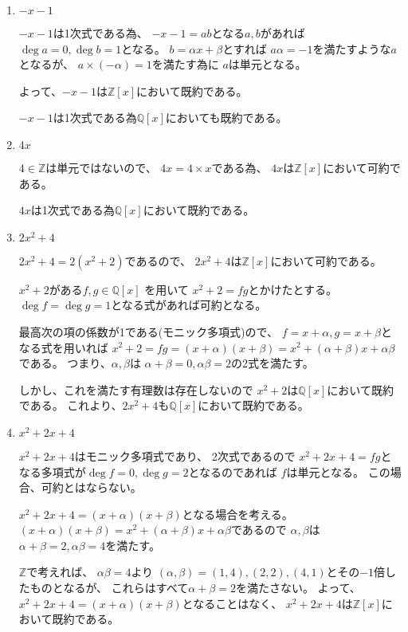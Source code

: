 \documentclass[12pt,b5paper]{ltjsarticle}
\begin{document}
\dotfill

\begin{enumerate}
 \item $-x-1$

       $-x-1$は1次式である為、
       $-x-1 = ab$となる$a,b$があれば
       $\deg{a}=0,\deg{b}=1$となる。
       $b=\alpha x + \beta$とすれば
       $a\alpha =-1$を満たすような$a$となるが、
       $a\times (-\alpha)=1$を満たす為に
       $a$は単元となる。

       よって、$-x-1$は$\mathbb{Z}[x]$において既約である。

       $-x-1$は1次式である為$\mathbb{Q}[x]$においても既約である。


 \item $4x$

       $4\in\mathbb{Z}$は単元ではないので、
       $4x=4\times x$である為、
       $4x$は$\mathbb{Z}[x]$において可約である。

       $4x$は1次式である為$\mathbb{Q}[x]$において既約である。

 \item $2x^2+4$

       $2x^2+4=2(x^2+2)$であるので、
       $2x^2+4$は$\mathbb{Z}[x]$において可約である。

       $x^2+2$がある$f,g\in\mathbb{Q}[x]$
       を用いて
       $x^2+2=fg$とかけたとする。
       $\deg{f}=\deg{g}=1$となる式があれば可約となる。

       最高次の項の係数が1である(モニック多項式)ので、
       $f=x+\alpha,g=x+\beta$となる式を用いれば
       $x^2+2=fg=(x+\alpha)(x+\beta)=x^2+(\alpha+\beta)x+\alpha\beta$
       である。
       つまり、$\alpha,\beta$は
       $\alpha+\beta=0,\alpha\beta=2$の2式を満たす。

       しかし、これを満たす有理数は存在しないので
       $x^2+2$は$\mathbb{Q}[x]$において既約である。
       これより、$2x^2+4$も$\mathbb{Q}[x]$において既約である。


 \item $x^2+2x+4$

       $x^2+2x+4$はモニック多項式であり、
       2次式であるので
       $x^2+2x+4=fg$となる多項式が$\deg{f}=0,\deg{g}=2$となるのであれば
       $f$は単元となる。
       この場合、可約とはならない。

       $x^2+2x+4=(x+\alpha)(x+\beta)$となる場合を考える。
       $(x+\alpha)(x+\beta)=x^2+(\alpha+\beta)x+\alpha\beta$であるので
       $\alpha,\beta$は$\alpha+\beta=2,\alpha\beta=4$を満たす。

       $\mathbb{Z}$で考えれば、
       $\alpha\beta=4$より
       $(\alpha,\beta)=(1,4),(2,2),(4,1)$とその$-1$倍したものとなるが、
       これらはすべて$\alpha+\beta=2$を満たさない。
       よって、$x^2+2x+4=(x+\alpha)(x+\beta)$となることはなく、
       $x^2+2x+4$は$\mathbb{Z}[x]$において既約である。


\end{enumerate}
\end{document}
